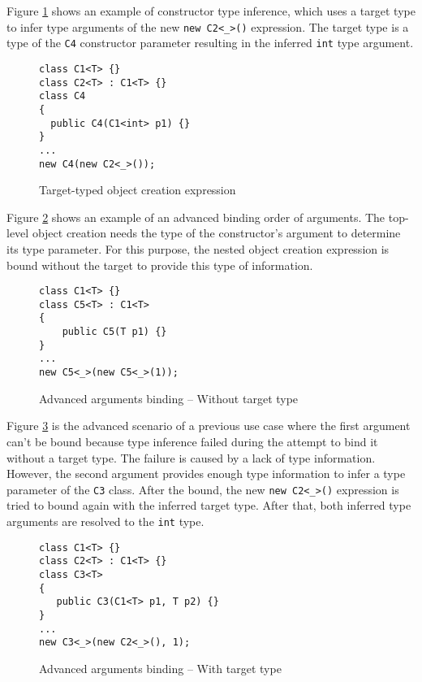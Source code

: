 \par
Figure \ref{img76:example4} shows an example of constructor type inference, which uses a target type to infer type arguments of the new \texttt{new C2<\_>()} expression. 
The target type is a type of the \texttt{C4} constructor parameter resulting in the inferred \texttt{int} type argument.
\begin{figure}[h]
\begin{lstlisting}[style=csharp, showstringspaces=false]
class C1<T> {}
class C2<T> : C1<T> {}
class C4 
{
  public C4(C1<int> p1) {}
}
...
new C4(new C2<_>());
\end{lstlisting}
\caption{Target-typed object creation expression}
\label{img76:example4}
\end{figure}
\par
Figure \ref{img77:example5} shows an example of an advanced binding order of arguments. 
The top-level object creation needs the type of the constructor’s argument to determine its type parameter. 
For this purpose, the nested object creation expression is bound without the target to provide this type of information.
\begin{figure}[h]
\begin{lstlisting}[style=csharp, showstringspaces=false]
class C1<T> {}
class C5<T> : C1<T>
{
    public C5(T p1) {}
}
...
new C5<_>(new C5<_>(1));
\end{lstlisting}
\caption{Advanced arguments binding -- Without target type}
\label{img77:example5}
\end{figure}
\par
Figure \ref{img78:example6} is the advanced scenario of a previous use case where the first argument can’t be bound because type inference failed during the attempt to bind it without a target type.
The failure is caused by a lack of type information. 
However, the second argument provides enough type information to infer a type parameter of the \texttt{C3} class. 
After the bound, the new \texttt{new C2<\_>()} expression is tried to bound again with the inferred target type.
After that, both inferred type arguments are resolved to the \texttt{int} type.
\begin{figure}[h]
\begin{lstlisting}[style=csharp, showstringspaces=false]
class C1<T> {}
class C2<T> : C1<T> {}
class C3<T>
{
   public C3(C1<T> p1, T p2) {}
}
...
new C3<_>(new C2<_>(), 1);
\end{lstlisting}
\caption{Advanced arguments binding -- With target type}
\label{img78:example6}
\end{figure}
